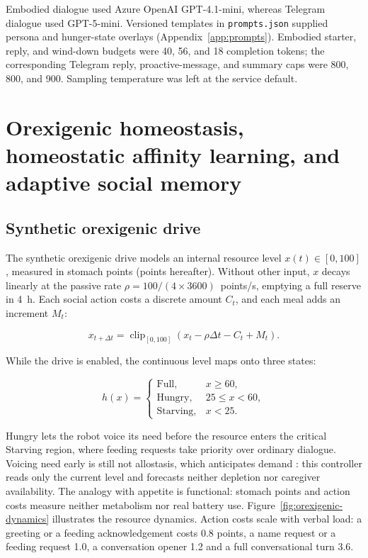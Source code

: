 Embodied dialogue used Azure OpenAI GPT-4.1-mini, whereas Telegram dialogue used GPT-5-mini. Versioned templates in \texttt{prompts.json} supplied persona and hunger-state overlays (Appendix~\ref{app:prompts}). Embodied starter, reply, and wind-down budgets were 40, 56, and 18 completion tokens; the corresponding Telegram reply, proactive-message, and summary caps were 800, 800, and 900. Sampling temperature was left at the service default.

\section{Orexigenic homeostasis, homeostatic affinity learning, and adaptive social memory}
\label{sec:homeostasis-affinity-memory}

\subsection{Synthetic orexigenic drive}
\label{subsec:internal-regulation-model}

The synthetic orexigenic drive models an internal resource level $x(t) \in [0, 100]$, measured in stomach points (points hereafter). Without other input, $x$ decays linearly at the passive rate $\rho = 100/(4\times3600)$~points/s, emptying a full reserve in 4~h. Each social action costs a discrete amount $C_t$, and each meal adds an increment $M_t$:

\begin{equation}
    x_{t+\Delta t}=\operatorname{clip}_{[0,100]}\left(x_t-\rho\Delta t-C_t+M_t\right).
    \label{eq:resource-dynamics}
\end{equation}

While the drive is enabled, the continuous level maps onto three states:

\begin{equation}
    h(x)=
    \begin{cases}
        \mathrm{Full}, & x\geq60,\\
        \mathrm{Hungry}, & 25\leq x<60,\\
        \mathrm{Starving}, & x<25.
    \end{cases}
    \label{eq:regulatory-state-partition}
\end{equation}

Hungry lets the robot voice its need before the resource enters the critical Starving region, where feeding requests take priority over ordinary dialogue. Voicing need early is still not allostasis, which anticipates demand \citep{Sterling2012Allostasis,SchulkinSterling2019Allostasis}: this controller reads only the current level and forecasts neither depletion nor caregiver availability. The analogy with appetite is functional: stomach points and action costs measure neither metabolism nor real battery use. Figure~\ref{fig:orexigenic-dynamics} illustrates the resource dynamics. Action costs scale with verbal load: a greeting or a feeding acknowledgement costs 0.8 points, a name request or a feeding request 1.0, a conversation opener 1.2 and a full conversational turn 3.6.

